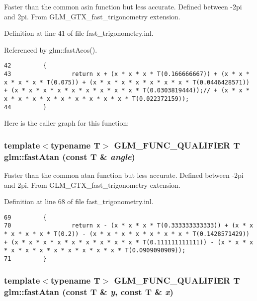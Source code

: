 Faster than the common asin function but less accurate. Defined between -2pi and 2pi. From GLM\_\-GTX\_\-fast\_\-trigonometry extension. 

Definition at line 41 of file fast\_\-trigonometry.inl.

Referenced by glm::fastAcos().

\begin{Code}\begin{verbatim}42         {
43                 return x + (x * x * x * T(0.166666667)) + (x * x * x * x * x * T(0.075)) + (x * x * x * x * x * x * x * T(0.0446428571)) + (x * x * x * x * x * x * x * x * x * T(0.0303819444));// + (x * x * x * x * x * x * x * x * x * x * x * T(0.022372159));
44         }
\end{verbatim}
\end{Code}




Here is the caller graph for this function:\hypertarget{group__gtx__fast__trigonometry_g0f10c61865500e4cfe86ad070e5d6312}{
\subsubsection[fastAtan]{\setlength{\rightskip}{0pt plus 5cm}template$<$typename T$>$ GLM\_\-FUNC\_\-QUALIFIER T glm::fastAtan (const T \& {\em angle})}}
\label{group__gtx__fast__trigonometry_g0f10c61865500e4cfe86ad070e5d6312}


Faster than the common atan function but less accurate. Defined between -2pi and 2pi. From GLM\_\-GTX\_\-fast\_\-trigonometry extension. 

Definition at line 68 of file fast\_\-trigonometry.inl.

\begin{Code}\begin{verbatim}69         {
70                 return x - (x * x * x * T(0.333333333333)) + (x * x * x * x * x * T(0.2)) - (x * x * x * x * x * x * x * T(0.1428571429)) + (x * x * x * x * x * x * x * x * x * T(0.111111111111)) - (x * x * x * x * x * x * x * x * x * x * x * T(0.0909090909));
71         }
\end{verbatim}
\end{Code}


\hypertarget{group__gtx__fast__trigonometry_gc6605aad8dce8278938f58b6e68b036a}{
\subsubsection[fastAtan]{\setlength{\rightskip}{0pt plus 5cm}template$<$typename T$>$ GLM\_\-FUNC\_\-QUALIFIER T glm::fastAtan (const T \& {\em y}, \/  const T \& {\em x})}}
\label{group__gtx__fast__trigonometry_gc6605aad8dce8278938f58b6e68b036a}


